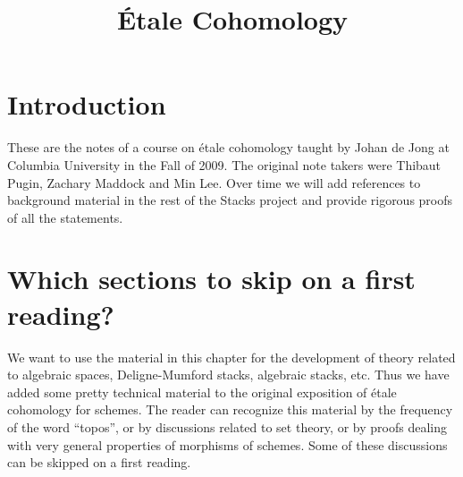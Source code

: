 

%


\title{\'Etale Cohomology}


\maketitle

\label{section-phantom}

\tableofcontents


\section{Introduction}
\label{section-introduction}

\noindent
These are the notes of a course on \'etale cohomology taught by Johan de Jong
at Columbia University in the Fall of 2009. The original note takers were
Thibaut Pugin, Zachary Maddock and Min Lee. Over time we will add references
to background material in the rest of the Stacks project and provide rigorous
proofs of all the statements.



\section{Which sections to skip on a first reading?}
\label{section-skip}

\noindent
We want to use the material in this chapter for the development of
theory related to algebraic spaces, Deligne-Mumford stacks, algebraic stacks,
etc. Thus we have added some pretty technical material to the original
exposition of \'etale cohomology for schemes. The reader can recognize this
material by the frequency of the word ``topos'', or by discussions related
to set theory, or by proofs dealing with very general properties of morphisms
of schemes. Some of these discussions can be skipped on a first reading.

